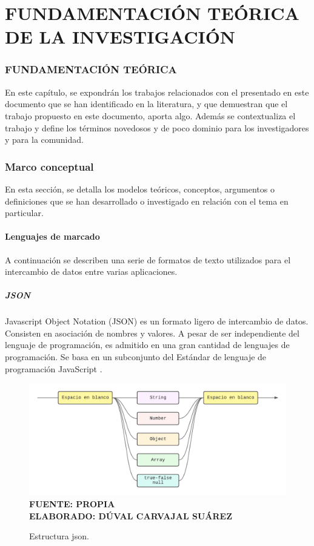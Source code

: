 \setcounter{chapter}{2}
\setcounter{section}{0}
\part{FUNDAMENTACIÓN TEÓRICA DE LA INVESTIGACIÓN}

\section*{FUNDAMENTACIÓN TEÓRICA}
En este capítulo, se expondrán los trabajos relacionados con el presentado en este documento que se han identificado en la literatura, y que demuestran que el trabajo propuesto en este documento, aporta algo. Además se contextualiza el trabajo y define los términos novedosos y de poco dominio para los investigadores y para la comunidad.

\section{Marco conceptual}

En esta sección, se detalla los modelos teóricos, conceptos, argumentos o definiciones que se han desarrollado o investigado en relación con el tema en particular.


\subsection{Lenguajes de marcado}	

A continuación se describen una serie de formatos de texto utilizados para el intercambio de datos entre varias aplicaciones.

\subsubsection{JSON}

Javascript Object Notation (JSON) es un formato ligero de intercambio de datos. Consisten en asociación de nombres y valores. A pesar de ser independiente del lenguaje de programación, es admitido en una gran cantidad de lenguajes de programación. Se basa en un subconjunto del Estándar de lenguaje de programación JavaScript \cite{JSON}.

\begin{figure}[h!]
	\caption{Estructura json.}
	\includegraphics[width=12cm]{img/json.png}
	\label{fig:json}
	\textbf{\\ FUENTE: PROPIA \\ ELABORADO: DÚVAL CARVAJAL SUÁREZ} 
\end{figure}

